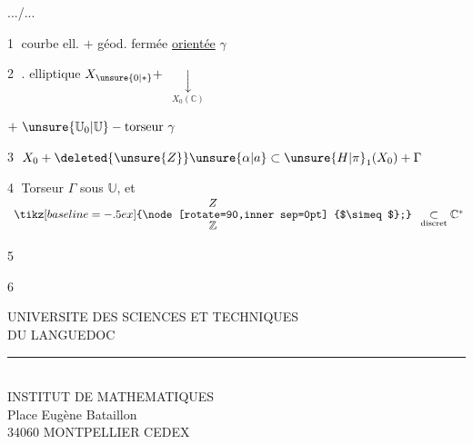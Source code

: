 .../...

\textcircled{1} courbe ell. $+$ géod. fermée \uline{orientée} $\gamma$

\textcircled{2} .  elliptique $X_{\unsure{0|*}}+$ 
$\displaystyle\underset{X_0(\mathbb C)}{\downarrow}$

$+\ \unsure{\mathbb U_0|\mathbb U}-\text{torseur}\ \gamma$

\textcircled{3} $X_0+\deleted{\unsure{Z}}\unsure{\alpha|a}\subset\unsure{H|\pi}_1(X_0)+\Gamma$

\textcircled{4} Torseur $\Gamma$ sous $\mathbb U$, et
$\begin{array}{c}Z\\[-2pt]\tikz[baseline=-.5ex]{\node[rotate=90,inner sep=0pt] {$\simeq$};}\\[-2pt]\mathbb Z\end{array}
\underset{\text{discret}}{\subset}\mathbb C^{*}$

\textcircled{5}

\textcircled{6}

\begin{center}
UNIVERSITE DES SCIENCES ET TECHNIQUES\\
DU LANGUEDOC\\
\rule{1cm}{0.2pt}\\
INSTITUT DE MATHEMATIQUES\\
Place Eugène Bataillon\\
34060 MONTPELLIER CEDEX
\end{center}


